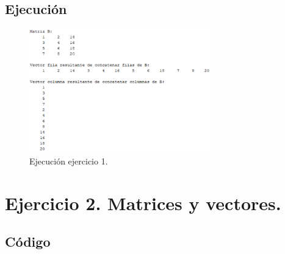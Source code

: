 \documentclass[a4paper, 12pt]{article}
\begin{document}
	\subsection{Ejecución}
	\begin{figure}[htp!]
		\centering
		\includegraphics[width=0.7\textwidth]{figures/ejc1.png}
		\caption{Ejecución ejercicio 1.}
	\end{figure}
	
	\section{Ejercicio 2. Matrices y vectores.}
	
	\subsection{Código}
	\inputminted[fontsize=\scriptsize, linenos, breaklines=true, xleftmargin=0.75cm, frame=lines]{matlab}{code/Ejercicio2.m}
\end{document}
